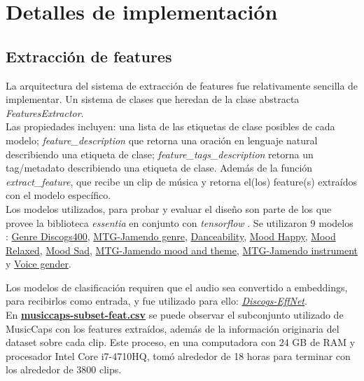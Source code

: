\section{Detalles de implementación}
\label{sec:implementation}

\subsection{Extracción de features}
\label{subsec:essentia}
La arquitectura del sistema de extracción de features fue relativamente sencilla de implementar. Un sistema de clases que heredan de la clase abstracta \textit{FeaturesExtractor}. \\
Las propiedades incluyen: una lista de las etiquetas de clase posibles de cada modelo; \textit{feature\_description} que retorna una oración en lenguaje natural describiendo una etiqueta de clase; \textit{feature\_tags\_description} retorna un tag/metadato describiendo una etiqueta de clase. Además de la función \textit{extract\_feature}, que recibe un clip de música y retorna el(los) feature(s) extraídos con el modelo específico. \\
Los modelos utilizados, para probar y evaluar el diseño son parte de los que provee la biblioteca \textit{essentia} en conjunto con \textit{tensorflow} \cite{alonso2020tensorflow}. Se utilizaron 9 modelos : \href{https://essentia.upf.edu/models.html#genre-discogs400}{Genre Discogs400}, \href{https://essentia.upf.edu/models.html#mtg-jamendo-genre}{MTG-Jamendo genre},  \href{https://essentia.upf.edu/models.html#danceability}{Danceability}, \href{https://essentia.upf.edu/models.html#mood-happy}{Mood Happy}, \href{https://essentia.upf.edu/models.html#mood-relaxed}{Mood Relaxed}, \href{https://essentia.upf.edu/models.html#mood-sad}{Mood Sad}, \href{https://essentia.upf.edu/models.html#mtg-jamendo-mood-and-theme}{MTG-Jamendo mood and theme}, \href{https://essentia.upf.edu/models.html#mtg-jamendo-instrument}{MTG-Jamendo instrument} y \href{https://essentia.upf.edu/models.html#voice-gender}{Voice gender}.

Los modelos de clasificación requiren que el audio sea convertido a embeddings, para recibirlos como entrada, y fue utilizado para ello: \href{https://essentia.upf.edu/models.html#discogs-effnet}{\textit{Discogs-EffNet}}.\\
En \href{https://github.com/NileyGF/Busqueda-semantica-en-audios.-Tesis/blob/main/src/data/musiccaps-subset-feat.csv}{\textbf{musiccaps-subset-feat.csv}} se puede observar el subconjunto utilizado de MusicCaps con los features extraídos, además de la información originaria del dataset sobre 
cada clip. Este proceso, en una computadora con 24 GB de RAM y procesador Intel Core i7-4710HQ, tomó alrededor de 18 horas para terminar con los alrededor de 3800 clips.

